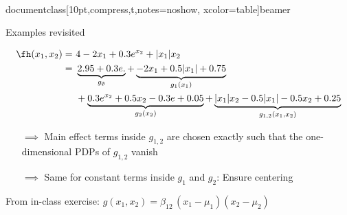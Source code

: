 \\documentclass[10pt,compress,t,notes=noshow, xcolor=table]{beamer}
\begin{document}
\begin{frame}{Examples revisited}

    \begin{example}
        \begin{align*}
            \fh(x_1, x_2) =\,&\,4 - 2x_1 + 0.3 e^{x_2} + |x_1|x_2 \\
                =\,&\,\underbrace{2.95 + 0.3 e.}_{g_\emptyset} + \underbrace{-2x_1 + 0.5|x_1| + 0.75}_{g_1(x_1)} \\
                \,&\,+ \underbrace{0.3 e^{x_2} + 0.5x_2 - 0.3e + 0.05}_{g_2(x_2)} + \underbrace{|x_1| x_2 - 0.5 |x_1| - 0.5 x_2 + 0.25}_{g_{1,2}(x_1, x_2)}
        \end{align*}
        \begin{itemize}
            \item[$\implies$] Main effect terms inside $g_{1,2}$ are chosen exactly such that the one-dimensional PDPs of $g_{1,2}$ vanish
            \item[$\implies$] Same for constant terms inside $g_1$ and $g_2$: Ensure centering
        \end{itemize}
    \end{example}

    \pause
    \begin{example}
        From in-class exercise:
        $
        g(x_1,x_2)
         = \beta_{12}\,(x_1-\mu_1)(x_2-\mu_2)
        $
    \end{example}
    
\end{frame}


    
\end{document}
